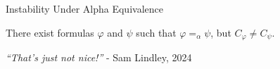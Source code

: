 \documentclass[aspectratio=169]{beamer}
\begin{document}
\begin{frame}{Instability Under Alpha Equivalence}
  \begin{theorem}
    There exist formulas $\varphi$ and $\psi$ such that $\varphi =_{\alpha} \psi$, but $C_{\varphi} \neq C_{\psi}$.
  \end{theorem}
  \smallskip
  \center\emph{``That's just not nice!''} - Sam Lindley, 2024

  \vspace{12em}

\end{frame}


%
%
%
%
%
%
%
%
\end{document}
